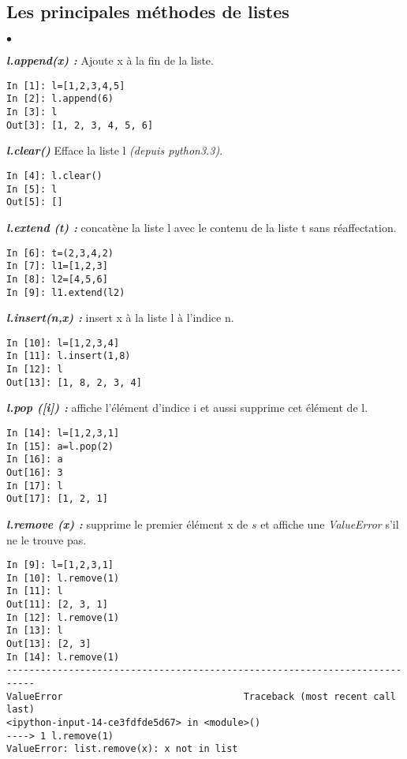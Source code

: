 \documentclass[10pt,dvipsnames,  dvips]{article}
\begin{document}
\subsection{Les principales méthodes de listes}
\begin{list}{$\bullet$}{}
\item \textit{\textbf{l.append(x) :}} Ajoute x à la fin de la liste.
\begin{lstlisting}
In [1]: l=[1,2,3,4,5]
In [2]: l.append(6)
In [3]: l
Out[3]: [1, 2, 3, 4, 5, 6]
\end{lstlisting}


\item \textit{\textbf{l.clear() }} Efface la liste l \textit{(depuis python3.3)}.
\begin{lstlisting}
In [4]: l.clear()
In [5]: l
Out[5]: []
\end{lstlisting}

\item \textit{\textbf{l.extend (t) :}} concatène la liste l avec le contenu de la liste t sans réaffectation.
\begin{lstlisting}
In [6]: t=(2,3,4,2)
In [7]: l1=[1,2,3]
In [8]: l2=[4,5,6]
In [9]: l1.extend(l2)
\end{lstlisting}
\item \textit{\textbf{l.insert(n,x) :}} insert x à la liste l à l'indice n.
\begin{lstlisting}
In [10]: l=[1,2,3,4]
In [11]: l.insert(1,8)
In [12]: l
Out[13]: [1, 8, 2, 3, 4]
\end{lstlisting}

\item \textit{\textbf{l.pop ([i]) :}}  affiche l'élément d'indice i et aussi supprime cet élément de l.
\begin{lstlisting}
In [14]: l=[1,2,3,1]
In [15]: a=l.pop(2)
In [16]: a
Out[16]: 3
In [17]: l
Out[17]: [1, 2, 1]
\end{lstlisting}

\item \textit{\textbf{l.remove (x) :}} supprime le premier élément x de $s$ et affiche une \textit{ValueError} s'il ne le trouve pas.
\begin{lstlisting}
In [9]: l=[1,2,3,1]
In [10]: l.remove(1)
In [11]: l
Out[11]: [2, 3, 1]
In [12]: l.remove(1)
In [13]: l
Out[13]: [2, 3]
In [14]: l.remove(1)
---------------------------------------------------------------------------
ValueError                                Traceback (most recent call last)
<ipython-input-14-ce3fdfde5d67> in <module>()
----> 1 l.remove(1)
ValueError: list.remove(x): x not in list
\end{lstlisting}


\end{list}
\end{document}
